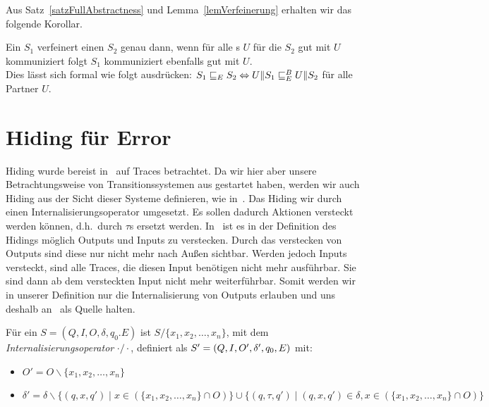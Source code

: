 Aus Satz~\ref{satzFullAbstractness} und Lemma~\ref{lemVerfeinerung} erhalten
wir das folgende Korollar.

\begin{kor}
  Ein \EIO{} $S_1$ verfeinert einen \EIO{} $S_2$ genau dann, wenn für alle \EIO{}s $U$
  für die $S_2$ gut mit $U$ kommuniziert folgt $S_1$ kommuniziert
  ebenfalls gut mit $U$.\\
  Dies lässt sich formal wie folgt ausdrücken: $S_1\sqsubseteq _E S_2
  \Leftrightarrow U\|S_1\sqsubseteq _E^B U\|S_2$ für alle Partner $U$.
\end{kor}

\section{Hiding für Error}

Hiding wurde bereist in~\cite{Chilton2013} auf Traces betrachtet. Da wir hier
aber unsere Betrachtungsweise von Transitionssystemen aus gestartet haben, werden
wir auch Hiding aus der Sicht dieser Systeme definieren, wie
in~\cite{Schlosser2012BA}. Das Hiding wir durch einen Internalisierungsoperator
umgesetzt. Es sollen dadurch Aktionen versteckt werden können, d.h.\ durch
$\tau$s ersetzt werden. In~\cite{Chilton2013} ist es in der Definition des
Hidings möglich Outputs und Inputs zu verstecken. Durch das verstecken von
Outputs sind diese nur nicht mehr nach Außen sichtbar. Werden jedoch Inputs
versteckt, sind alle Traces, die diesen Input benötigen nicht mehr ausführbar.
Sie sind dann ab dem versteckten Input nicht mehr weiterführbar. Somit werden
wir in unserer Definition nur die Internalisierung von Outputs erlauben und uns
deshalb an~\cite{Schlosser2012BA} als Quelle halten.

\begin{Def}[Internalisierungsoperator]
  Für ein \EIO{} $S=(Q,I,O,\delta ,q_0.E)$ ist $S/\{x_1,x_2,\dots ,x_n\}$, mit
  dem \emph{Internalisierungsoperator} $\cdot /\cdot$, definiert als
  $S'=(Q,I,O',\linebreak\delta ',q_0,E)$ mit:
  \begin{itemize}
    \item $O'=O\backslash \{x_1,x_2,\dots ,x_n\}$
    \item $\delta '=\delta\backslash \{(q,x,q')\mid x\in(\{x_1,x_2,\dots
      ,x_n\}\cap O)\}\cup\{(q,\tau ,q')\mid (q,x,q')\in\delta ,
      x\in(\{x_1,x_2,\dots ,x_n\}\cap O)\}$
  \end{itemize}
\end{Def}

